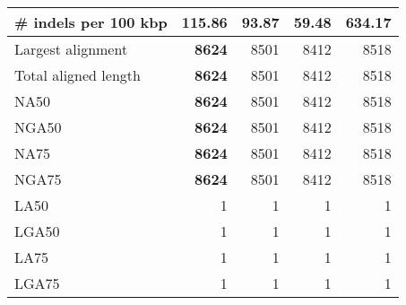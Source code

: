 \documentclass[12pt,a4paper]{article}
\begin{document}
\begin{table}[ht]
\begin{center}
\begin{tabular}{|l*{4}{|r}|}
\# indels per 100 kbp & 115.86 & 93.87 & {\bf 59.48} & 634.17 \\ \hline
Largest alignment & {\bf 8624} & 8501 & 8412 & 8518 \\ \hline
Total aligned length & {\bf 8624} & 8501 & 8412 & 8518 \\ \hline
NA50 & {\bf 8624} & 8501 & 8412 & 8518 \\ \hline
NGA50 & {\bf 8624} & 8501 & 8412 & 8518 \\ \hline
NA75 & {\bf 8624} & 8501 & 8412 & 8518 \\ \hline
NGA75 & {\bf 8624} & 8501 & 8412 & 8518 \\ \hline
LA50 & 1 & 1 & 1 & 1 \\ \hline
LGA50 & 1 & 1 & 1 & 1 \\ \hline
LA75 & 1 & 1 & 1 & 1 \\ \hline
LGA75 & 1 & 1 & 1 & 1 \\ \hline
\end{tabular}
\end{center}
\end{table}
\end{document}
